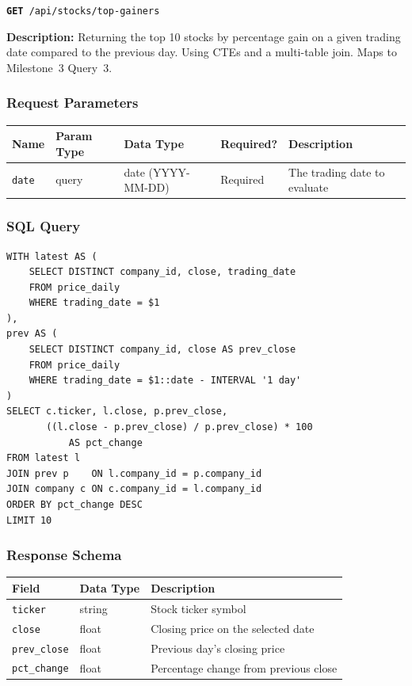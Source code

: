 \documentclass[11pt]{article}
\newcommand{\route}[2]{\texttt{\textcolor{routecolor}{\textbf{#1}}~#2}}
\begin{document}
\route{GET}{/api/stocks/top-gainers}

\medskip\noindent
\textbf{Description:} Returning the top 10 stocks by percentage gain on a given trading date compared to the previous day. Using CTEs and a multi-table join. Maps to Milestone~3 Query~3.

\subsubsection*{Request Parameters}

\begin{center}
\small
\begin{tabular}{l l l l p{5cm}}
\toprule
\textbf{Name} & \textbf{Param Type} & \textbf{Data Type} & \textbf{Required?} & \textbf{Description} \\
\midrule
\texttt{date} & query & date (YYYY-MM-DD) & Required & The trading date to evaluate \\
\bottomrule
\end{tabular}
\end{center}

\subsubsection*{SQL Query}
\begin{lstlisting}[style=sql,basicstyle=\ttfamily\scriptsize]
WITH latest AS (
    SELECT DISTINCT company_id, close, trading_date
    FROM price_daily
    WHERE trading_date = $1
),
prev AS (
    SELECT DISTINCT company_id, close AS prev_close
    FROM price_daily
    WHERE trading_date = $1::date - INTERVAL '1 day'
)
SELECT c.ticker, l.close, p.prev_close,
       ((l.close - p.prev_close) / p.prev_close) * 100
           AS pct_change
FROM latest l
JOIN prev p    ON l.company_id = p.company_id
JOIN company c ON c.company_id = l.company_id
ORDER BY pct_change DESC
LIMIT 10
\end{lstlisting}

\subsubsection*{Response Schema}

\begin{center}
\small
\begin{tabular}{l l p{7cm}}
\toprule
\textbf{Field} & \textbf{Data Type} & \textbf{Description} \\
\midrule
\texttt{ticker}      & string & Stock ticker symbol \\
\texttt{close}       & float  & Closing price on the selected date \\
\texttt{prev\_close} & float  & Previous day's closing price \\
\texttt{pct\_change} & float  & Percentage change from previous close \\
\bottomrule
\end{tabular}
\end{center}
\end{document}
